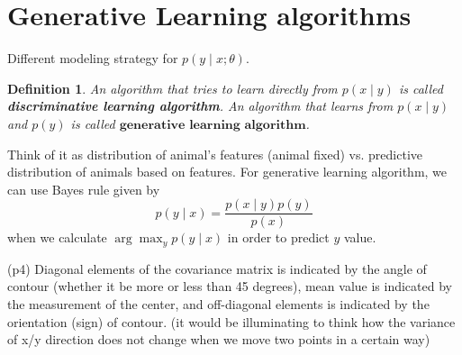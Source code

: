 \documentclass{article}
\newtheorem{definition}{Definition}
\theoremstyle{remark}
\begin{document}
\section*{Generative Learning algorithms}
Different modeling strategy for $p(y\mid x;\theta)$.\\
\begin{definition}
    An algorithm that tries to learn directly from $p(x\mid y)$ is called \textbf{discriminative learning algorithm}. An algorithm that learns from $p(x\mid y)$ and $p(y)$ is called $\textbf{generative learning algorithm}$.
\end{definition}

Think of it as distribution of animal's features (animal fixed) vs. predictive distribution of animals based on features.
For generative learning algorithm, we can use Bayes rule given by $$p(y\mid x)=\frac{p(x\mid y)p(y)}{p(x)}$$ when we calculate $\arg\max_y p(y\mid x)$ in order to predict $y$ value.

(p4) Diagonal elements of the covariance matrix is indicated by the angle of contour (whether it be more or less than 45 degrees), mean value is indicated by the measurement of the center, and off-diagonal elements is indicated by the orientation (sign) of contour.
(it would be illuminating to think how the variance of x/y direction does not change when we move two points in a certain way)
\end{document}
